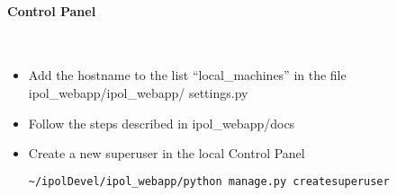 \paragraph{Control Panel} \hspace{0pt} \\
\begin{itemize}
 \item Add the hostname to the list ``local\_machines'' in the file ipol\_webapp/ipol\_webapp/ settings.py
 \item Follow the steps described in ipol\_webapp/docs
 \item Create a new superuser in the local Control Panel
  \begin{lstlisting}[language=Bash]
  ~/ipolDevel/ipol_webapp/python manage.py createsuperuser
  \end{lstlisting}
\end{itemize}
